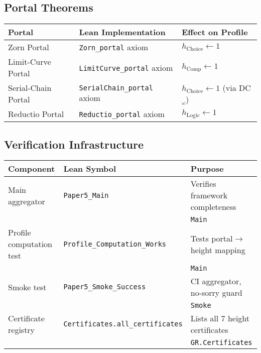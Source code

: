 \documentclass[11pt]{article}
\theoremstyle{definition}
\theoremstyle{remark}
\newcommand{\hChoice}{h_{\mathrm{Choice}}}    %
\newcommand{\hComp}{h_{\mathrm{Comp}}}        %
\newcommand{\hLogic}{h_{\mathrm{Logic}}}      %
\begin{document}
\subsection{Portal Theorems}

\begin{center}
\small
\begin{tabular}{|p{3.5cm}|p{5cm}|p{6cm}|}
\hline
\textbf{Portal} & \textbf{Lean Implementation} & \textbf{Effect on Profile} \\
\hline
Zorn Portal & \texttt{Zorn\_portal} axiom & $\hChoice \gets 1$ \\
\hline
Limit-Curve Portal & \texttt{LimitCurve\_portal} axiom & $\hComp \gets 1$ \\
\hline
Serial-Chain Portal & \texttt{SerialChain\_portal} axiom & $\hChoice \gets 1$ (via DC$_\omega$) \\
\hline
Reductio Portal & \texttt{Reductio\_portal} axiom & $\hLogic \gets 1$ \\
\hline
\end{tabular}
\end{center}

\subsection{Verification Infrastructure}

\begin{center}
\small
\begin{tabular}{|p{4cm}|p{5cm}|p{5.5cm}|}
\hline
\textbf{Component} & \textbf{Lean Symbol} & \textbf{Purpose} \\
\hline
Main aggregator & \texttt{Paper5\_Main} & Verifies framework completeness \\
& & \texttt{Main} \\
\hline
Profile computation test & \texttt{Profile\_Computation\_Works} & Tests portal$\to$height mapping \\
& & \texttt{Main} \\
\hline
Smoke test & \texttt{Paper5\_Smoke\_Success} & CI aggregator, no-sorry guard \\
& & \texttt{Smoke} \\
\hline
Certificate registry & \texttt{Certificates.all\_certificates} & Lists all 7 height certificates \\
& & \texttt{GR.Certificates} \\
\hline
\end{tabular}
\end{center}
\end{document}
